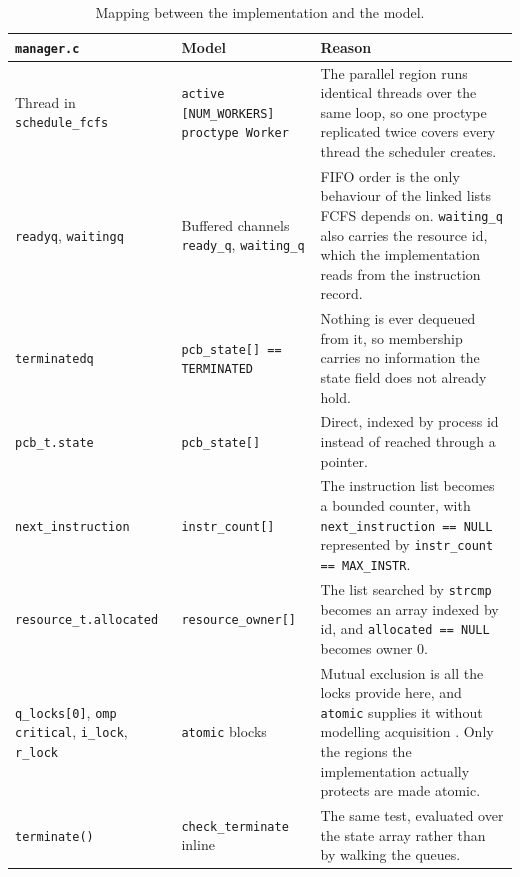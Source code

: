 \documentclass[10pt,a4paper]{article}
\newcommand{\code}[1]{\texttt{#1}}
\begin{document}
\begin{table}[htbp]
\centering
\caption{Mapping between the implementation and the model.}
\label{tab:mapping}
\begin{tabular}{p{3.2cm} p{3.4cm} p{7.2cm}}
\toprule
\textbf{\code{manager.c}} & \textbf{Model} & \textbf{Reason} \\
\midrule
Thread in \code{schedule\_fcfs} &
\code{active [NUM\_WORKERS] proctype Worker} &
The parallel region runs identical threads over the same loop, so one
proctype replicated twice covers every thread the scheduler creates. \\
\addlinespace
\code{readyq}, \code{waitingq} &
Buffered channels \code{ready\_q}, \code{waiting\_q} &
FIFO order is the only behaviour of the linked lists FCFS depends on.
\code{waiting\_q} also carries the resource id, which the implementation
reads from the instruction record. \\
\addlinespace
\code{terminatedq} &
\code{pcb\_state[] == TERMINATED} &
Nothing is ever dequeued from it, so membership carries no information the
state field does not already hold. \\
\addlinespace
\code{pcb\_t.state} &
\code{pcb\_state[]} &
Direct, indexed by process id instead of reached through a pointer. \\
\addlinespace
\code{next\_instruction} &
\code{instr\_count[]} &
The instruction list becomes a bounded counter, with
\code{next\_instruction == NULL} represented by
\code{instr\_count == MAX\_INSTR}. \\
\addlinespace
\code{resource\_t.allocated} &
\code{resource\_owner[]} &
The list searched by \code{strcmp} becomes an array indexed by id, and
\code{allocated == NULL} becomes owner 0. \\
\addlinespace
\code{q\_locks[0]}, \code{omp critical}, \code{i\_lock}, \code{r\_lock} &
\code{atomic} blocks &
Mutual exclusion is all the locks provide here, and \code{atomic} supplies it
without modelling acquisition \cite{spin_atomic}. Only the regions the
implementation actually protects are made atomic. \\
\addlinespace
\code{terminate()} &
\code{check\_terminate} inline &
The same test, evaluated over the state array rather than by walking the
queues. \\
\bottomrule
\end{tabular}
\end{table}
\end{document}
